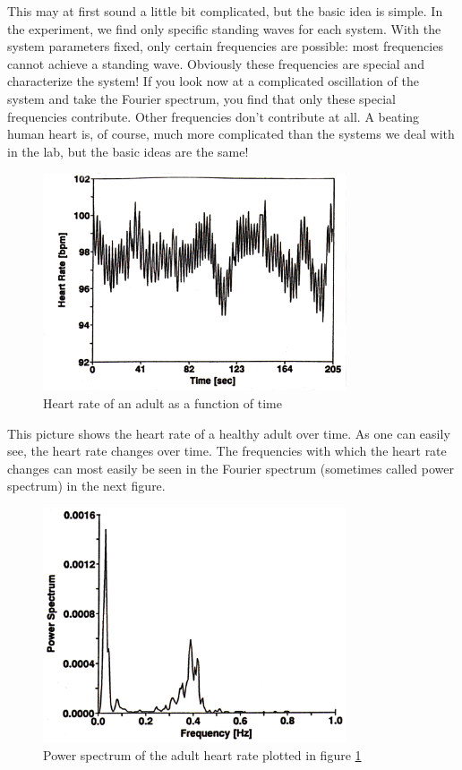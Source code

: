 This may at first sound a little bit complicated, but the basic idea is simple. In the experiment, we find only specific standing waves for each system. With the system parameters fixed, only certain frequencies are possible: most frequencies cannot achieve a standing wave. Obviously these frequencies are special and characterize the system! If you look now at a complicated oscillation of the system and take the Fourier spectrum, you find that only these special frequencies contribute. Other frequencies don't contribute at all. A beating human heart is, of course, much more complicated than the systems we deal with in the lab, but the basic ideas are the same!\myskip
\begin{figure}[h]
\centering
\includegraphics[width=0.8\textwidth]{./Exp1-9/pic/image6.png}
\caption{Heart rate of an adult as a function of time}
\label{fig:heart}
\end{figure}

This picture shows the heart rate of a healthy adult over time. As one can easily see, the heart rate changes over time. The frequencies with which the heart rate changes can most easily be seen in the Fourier spectrum (sometimes called power spectrum) in the next figure.\myskip
\begin{figure}[h]
\centering
\includegraphics[width=0.8\textwidth]{./Exp1-9/pic/image7.png}
\caption{Power spectrum of the adult heart rate plotted in figure \ref{fig:heart}}
\end{figure}


